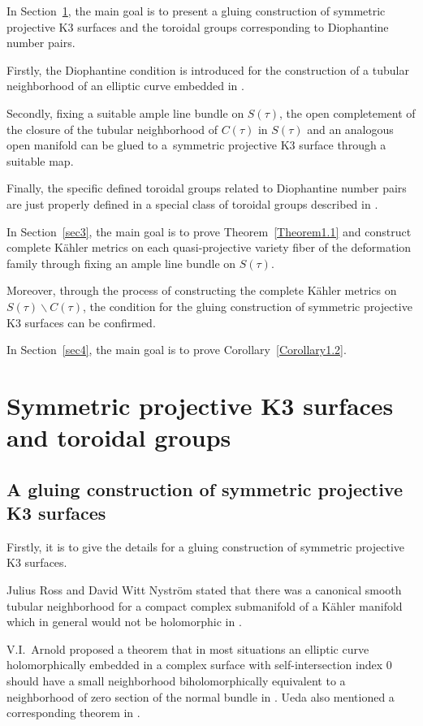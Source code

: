 \documentclass[10pt,a4paper]{amsart}
\numberwithin{equation}{section}
\def\operatorname#1{#1}
\def\overline#1{#1}
\begin{document}
In Section~\ref{sec2}, the main goal is to present a gluing construction of symmetric projective K3 surfaces and the toroidal groups corresponding to Diophantine number pairs.

Firstly, the Diophantine condition is introduced for the construction of a tubular neighborhood of an elliptic curve embedded in \smash{$\operatorname{CP}^2 \#9 \overline{\operatorname{CP}}^2$}.

Secondly, fixing a suitable ample line bundle on $S(\tau)$, the open completement of the closure of the tubular neighborhood of $C(\tau)$ in $S(\tau)$ and an analogous open manifold can be glued to a~symmetric projective K3 surface through a suitable map.

Finally, the specific defined toroidal groups related to Diophantine number pairs are just properly defined in a special class of toroidal groups described in \cite[Theorem]{Christian}.

In Section~\ref{sec3}, the main goal is to prove Theorem~\ref{Theorem1.1} and construct complete K\"ahler metrics on each quasi-projective variety fiber of the deformation family through fixing an ample line bundle on $S(\tau)$.

Moreover, through the process of constructing the complete K\"ahler metrics on $S(\tau)\backslash C(\tau)$, the condition for the gluing construction of symmetric projective K3 surfaces can be confirmed.

In Section~\ref{sec4}, the main goal is to prove Corollary~\ref{Corollary1.2}.

\section{Symmetric projective K3 surfaces and toroidal groups}\label{sec2}

\subsection{A gluing construction of symmetric projective K3 surfaces}

Firstly, it is to give the details for a gluing construction of symmetric projective K3 surfaces.

Julius Ross and David Witt Nystr\"om stated that there was a canonical smooth tubular neighborhood for a compact complex submanifold of a K\"ahler manifold which in general would not be holomorphic in \cite{Julius-David}.

V.I.~Arnold proposed a theorem that in most situations an elliptic curve holomorphically embedded in a complex surface with self-intersection index 0 should have a small neighborhood biholomorphically equivalent to a neighborhood of zero section of the normal bundle in \cite{Vladimir}. Ueda also mentioned a corresponding theorem in \cite{Tetsuo}.
\end{document}
